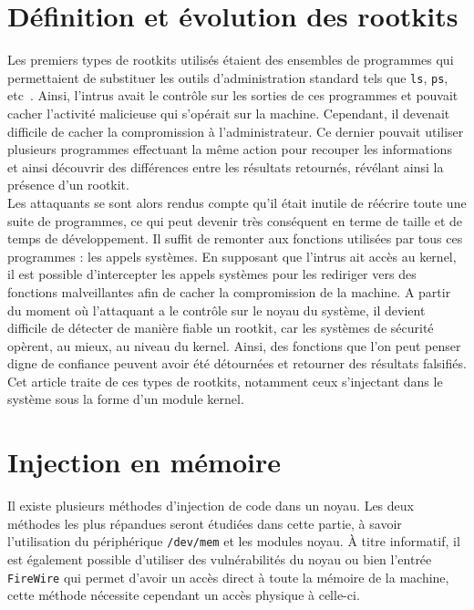 \documentclass[12pt]{article}
\begin{document}
\section{Définition et évolution des rootkits}
    
    Les premiers types de rootkits utilisés étaient des ensembles de programmes qui permettaient de substituer les outils d'administration standard tels que \texttt{ls}, \texttt{ps}, etc~\cite{sans}. Ainsi, l'intrus avait le contrôle sur les sorties de ces programmes et pouvait cacher l'activité malicieuse qui s'opérait sur la machine. Cependant, il devenait difficile de cacher la compromission à l'administrateur. Ce dernier pouvait utiliser plusieurs programmes effectuant la même action pour recouper les informations et ainsi découvrir des différences entre les résultats retournés, révélant ainsi la présence d'un rootkit.\\
    
    Les attaquants se sont alors rendus compte qu'il était inutile de réécrire toute une suite de programmes, ce qui peut devenir très conséquent en terme de taille et de temps de développement. Il suffit de remonter aux fonctions utilisées par tous ces programmes : les appels systèmes\cite{sans2}\cite{turbochaos}. En supposant que l'intrus ait accès au kernel, il est possible d'intercepter les appels systèmes pour les rediriger vers des fonctions malveillantes afin de cacher la compromission de la machine. A partir du moment où l'attaquant a le contrôle sur le noyau du système, il devient difficile de détecter de manière fiable un rootkit, car les systèmes de sécurité opèrent, au mieux, au niveau du kernel. Ainsi, des fonctions que l'on peut penser digne de confiance peuvent avoir été détournées et retourner des résultats falsifiés. \\
    Cet article traite de ces types de rootkits, notamment ceux s'injectant dans le système sous la forme d'un module kernel\cite{suterusu}.



\section{Injection en mémoire}

    Il existe plusieurs méthodes d'injection de code dans un noyau. Les deux méthodes les plus répandues seront étudiées dans cette partie, à savoir l'utilisation du périphérique \texttt{/dev/mem}\cite{devmen} et les modules noyau\cite{turbochaos}. À titre informatif, il est également possible d'utiliser des vulnérabilités du noyau ou bien l'entrée \texttt{FireWire}\cite{firewire} qui permet d'avoir un accès direct à toute la mémoire de la machine, cette méthode nécessite cependant un accès physique à celle-ci.
\end{document}
